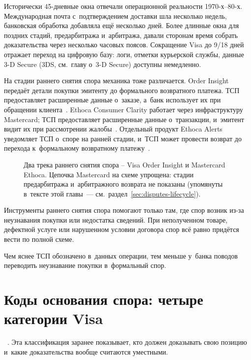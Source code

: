 Исторически 45-дневные окна отвечали операционной реальности
1970-х--80-х. Международная почта с~подтверждением доставки
шла несколько недель, банковская обработка добавляла ещё несколько дней.
Более длинные окна для поздних стадий, предарбитража и~арбитража,
давали сторонам время собрать доказательства через несколько
часовых поясов. Сокращение Visa до 9/18 дней отражает переход
на цифровую базу: логи, отметки курьерской службы, данные 3-D Secure
(3DS, см.~главу о~3-D Secure) доступны немедленно.

На стадии раннего снятия спора механика тоже различается.
Order Insight передаёт детали покупки эмитенту до
формального возвратного платежа. ТСП предоставляет расширенные
данные о~заказе, а~банк использует их при обращении
клиента~\cite{visa-order-insight}.
Ethoca Consumer Clarity работает через инфраструктуру Mastercard;
ТСП предоставляет расширенные данные о~транзакции, и~эмитент
видит их при рассмотрении жалобы~\cite{mc-dispute-management,mc-ethoca-consumer-clarity}.
Отдельный продукт Ethoca Alerts уведомляет ТСП о~споре
на ранней стадии, и~ТСП может провести возврат до
перехода к~формальному возвратному платежу~\cite{mc-dispute-management}.

\begin{figure}[tbp]
  \centering
  \caption{Два трека раннего снятия спора -- Visa Order Insight и Mastercard Ethoca.
    Цепочка Mastercard на схеме упрощена: стадии предарбитража
    и~арбитражного возврата не показаны (упомянуты в~тексте этой
    главы~--- см.~раздел~\ref{sec:disputes-lifecycle}).}\label{fig:vcr-vs-mc-flow}
\end{figure}

Инструменты раннего снятия спора помогают только там, где спор возник
из-за неузнавания покупки или недостатка сведений. При неполученном
товаре, дефектной услуге или нарушенном условии договора спор всё равно
придётся вести по полной схеме.

Чем яснее ТСП обозначено в~данных операции, тем меньше у~банка
поводов переводить неузнавание покупки в~формальный спор.

\section{Коды основания спора: четыре категории Visa}\label{sec:disputes-reason-codes}

~\cite{visa-core-rules}.
Эта классификация заранее показывает, кто должен доказывать свою
позицию и~какие доказательства вообще считаются уместными.


